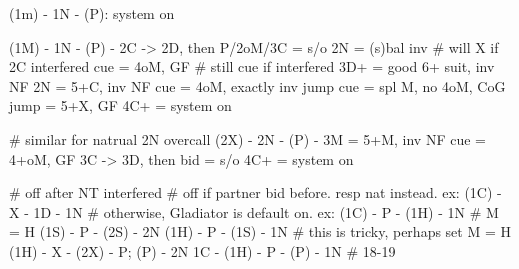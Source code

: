 (1m) - 1N - (P): system on

(1M) - 1N - (P) -
2C -> 2D, then
    P/2oM/3C = s/o
    2N = (s)bal inv  # will X if 2C interfered
    cue = 4oM, GF  # still cue if interfered
    3D+ = good 6+ suit, inv NF
2N = 5+C, inv NF
cue = 4oM, exactly inv
jump cue = spl M, no 4oM, CoG
jump = 5+X, GF
4C+ = system on

# similar for natrual 2N overcall
(2X) - 2N - (P) -
3M = 5+M, inv NF
cue = 4+oM, GF
3C -> 3D, then bid = s/o
4C+ = system on

# off after NT interfered
# off if partner bid before. resp nat instead. ex: (1C) - X - 1D - 1N
# otherwise, Gladiator is default on. ex:
(1C) - P - (1H) - 1N  # M = H
(1S) - P - (2S) - 2N
(1H) - P - (1S) - 1N  # this is tricky, perhaps set M = H
(1H) - X - (2X) - P; (P) - 2N
1C - (1H) - P - (P) - 1N  # 18-19